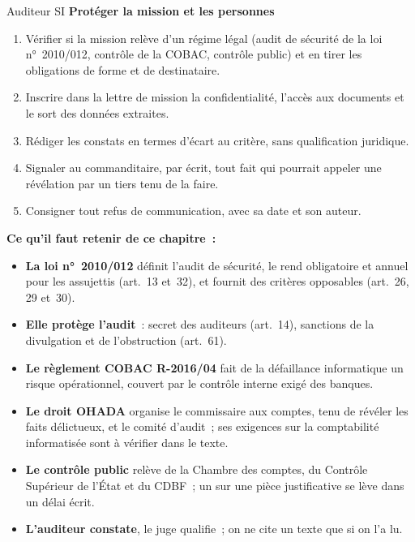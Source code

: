 \begin{boxmetier}{Auditeur SI}
\textbf{Protéger la mission et les personnes}
\begin{enumerate}
    \item Vérifier si la mission relève d'un régime légal (audit de
          sécurité de la loi n°~2010/012, contrôle de la COBAC, contrôle
          public) et en tirer les obligations de forme et de destinataire.
    \item Inscrire dans la lettre de mission la confidentialité, l'accès
          aux documents et le sort des données extraites.
    \item Rédiger les constats en termes d'écart au critère, sans
          qualification juridique.
    \item Signaler au commanditaire, par écrit, tout fait qui pourrait
          appeler une révélation par un tiers tenu de la faire.
    \item Consigner tout refus de communication, avec sa date et son
          auteur.
\end{enumerate}
\end{boxmetier}


\separateur

\begin{boxresume}
\textbf{Ce qu'il faut retenir de ce chapitre~:}
\begin{itemize}
    \item \textbf{La loi n°~2010/012} définit l'audit de sécurité, le rend
          obligatoire et annuel pour les assujettis (art.~13 et~32), et
          fournit des critères opposables (art.~26, 29 et~30).
    \item \textbf{Elle protège l'audit}~: secret des auditeurs (art.~14),
          sanctions de la divulgation et de l'obstruction (art.~61).
    \item \textbf{Le règlement COBAC R-2016/04} fait de la défaillance
          informatique un risque opérationnel, couvert par le contrôle
          interne exigé des banques.
    \item \textbf{Le droit OHADA} organise le commissaire aux comptes, tenu
          de révéler les faits délictueux, et le comité d'audit~; ses
          exigences sur la comptabilité informatisée sont à vérifier dans
          le texte.
    \item \textbf{Le contrôle public} relève de la Chambre des comptes, du
          Contrôle Supérieur de l'État et du CDBF~; un \NEK{} sur une pièce
          justificative se lève dans un délai écrit.
    \item \textbf{L'auditeur constate}, le juge qualifie~; on ne cite un
          texte que si on l'a lu.
\end{itemize}
\end{boxresume}

